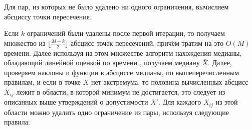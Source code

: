 \documentclass[12pt,a4paper]{article}
\begin{document}


\newpage
Для пар, из которых не было удалено ни одного ограничения, вычисляем абсциссу точки пересечения.\par
Если $k$ ограничений были удалены после первой итерации, то получаем множество из $\lfloor\frac{M-k}{2}\rfloor$ абсцисс точек пересечений, причём тратим на это $O(M)$ времени. Далее используя на этом множестве алгоритм нахождения медианы, обладающий линейной оценкой по времени \cite{Hopk00}, получаем медиану $\bar X$. 
Далее, проверяем наклоны и функции в абсциссе медианы, по вышеперечисленным правилам, и если в точке $\bar X$ нет экстремума, то половина вычисленных абсцисс ${X_{ij}}$ лежит в области, в которой минимум не достигается, это следует из описанных выше утверждений о допустимости $X'$.
Для каждого  $X_{ij}$ из этой области можно удалить одно ограничение из пары, используя следующие правила:
\end{document}
